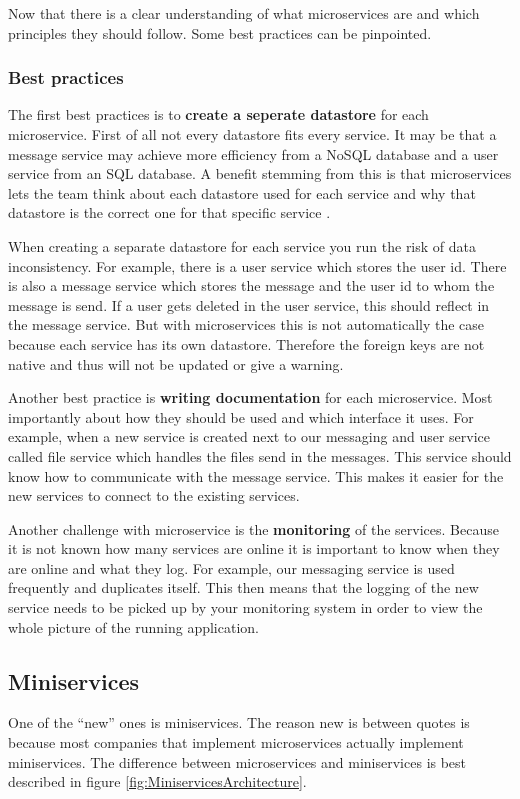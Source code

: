 Now that there is a clear understanding of what microservices are and which principles
they should follow. Some best practices can be pinpointed.

\subsubsection{Best practices}
The first best practices is to \textbf{create a seperate datastore} for each microservice. First of all not every datastore fits every service. It may be that a message service may achieve more efficiency from a NoSQL database and a user service from an SQL database. A benefit stemming from this is that microservices lets the team think about each datastore used for each service and why that datastore is the correct one for that specific service \cite{microservicesNetflix}.

When creating a separate datastore for each service you run the risk of data inconsistency. For example, there is a user service which stores the user id. There is also a message service which stores the message and the user id to whom the message is send. If a user gets deleted in the user service, this should reflect in the message service. But with microservices this is not automatically the case because each service has its own datastore. Therefore the foreign keys are not native and thus will not be updated or give a warning.

Another best practice is \textbf{writing documentation} \cite{microservicesBestPractice} for each microservice. Most importantly about how they should be used and which interface it uses. For example, when a new service is created next to our messaging and user service called file service which handles the files send in the messages. This service should know how to communicate with the message service. This makes it easier for the new services to connect to the existing services.

Another challenge with microservice is the \textbf{monitoring} \cite{microservicesBestPractice} of the services. Because it is not known how many services are online it is important to know when they are online and what they log. For example, our messaging service is used frequently and duplicates itself. This then means that the logging of the new service needs to be picked up by your monitoring system in order to view the whole picture of the running application.

\subsection{Miniservices}
One of the “new” ones is miniservices. The reason new is between quotes is because most companies that implement microservices actually implement miniservices. The difference between microservices and miniservices is best described in figure \ref{fig:MiniservicesArchitecture}.

